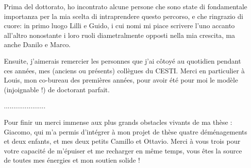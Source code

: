 Prima del dottorato, ho incontrato alcune persone che sono state di fondamentale importanza per la mia scelta di intraprendere questo percorso, e che ringrazio di cuore: in primo luogo Lilli e Guido, i cui nomi mi piace scrivere l'uno accanto all'altro nonostante i loro ruoli diametralmente opposti nella mia crescita, ma anche Danilo e Marco.

Ensuite, j'aimerais remercier les personnes que j'ai côtoyé au quotidien pendant ces années, mes (anciens ou présents) collègues du CESTI. Merci en particulier à Louis, mon co-bureau des premières années, pour avoir été pour moi le modèle (injoignable !) de doctorant parfait.  

......................

Pour finir un merci immense aux plus grands obstacles vivants de ma thèse : Giacomo, qui m'a permis d'intégrer à mon projet de thèse quatre déménagements et deux enfants, et mes deux petits Camillo et Ottavio. Merci à vous trois pour votre capacité de m'épuiser et me recharger en même temps, vous êtes la source de toutes mes énergies et mon soutien solide !